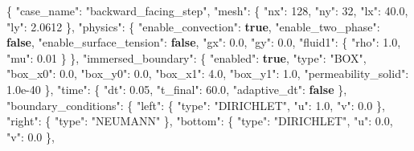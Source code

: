 \documentclass[
  french,
]{article}
\newenvironment{Shaded}{}{}
\newcommand{\DataTypeTok}[1]{\textcolor[rgb]{0.56,0.13,0.00}{#1}}
\newcommand{\DecValTok}[1]{\textcolor[rgb]{0.25,0.63,0.44}{#1}}
\newcommand{\FloatTok}[1]{\textcolor[rgb]{0.25,0.63,0.44}{#1}}
\newcommand{\FunctionTok}[1]{\textcolor[rgb]{0.02,0.16,0.49}{#1}}
\newcommand{\KeywordTok}[1]{\textcolor[rgb]{0.00,0.44,0.13}{\textbf{#1}}}
\newcommand{\StringTok}[1]{\textcolor[rgb]{0.25,0.44,0.63}{#1}}
\begin{document}
\begin{Shaded}
\begin{Highlighting}[]
\FunctionTok{\{}
  \DataTypeTok{"case\_name"}\FunctionTok{:} \StringTok{"backward\_facing\_step"}\FunctionTok{,}
  \DataTypeTok{"mesh"}\FunctionTok{:} \FunctionTok{\{} \DataTypeTok{"nx"}\FunctionTok{:} \DecValTok{128}\FunctionTok{,} \DataTypeTok{"ny"}\FunctionTok{:} \DecValTok{32}\FunctionTok{,} \DataTypeTok{"lx"}\FunctionTok{:} \FloatTok{40.0}\FunctionTok{,} \DataTypeTok{"ly"}\FunctionTok{:} \FloatTok{2.0612} \FunctionTok{\},}
  \DataTypeTok{"physics"}\FunctionTok{:} \FunctionTok{\{}
    \DataTypeTok{"enable\_convection"}\FunctionTok{:} \KeywordTok{true}\FunctionTok{,}
    \DataTypeTok{"enable\_two\_phase"}\FunctionTok{:} \KeywordTok{false}\FunctionTok{,}
    \DataTypeTok{"enable\_surface\_tension"}\FunctionTok{:} \KeywordTok{false}\FunctionTok{,}
    \DataTypeTok{"gx"}\FunctionTok{:} \FloatTok{0.0}\FunctionTok{,} \DataTypeTok{"gy"}\FunctionTok{:} \FloatTok{0.0}\FunctionTok{,}
    \DataTypeTok{"fluid1"}\FunctionTok{:} \FunctionTok{\{} \DataTypeTok{"rho"}\FunctionTok{:} \FloatTok{1.0}\FunctionTok{,} \DataTypeTok{"mu"}\FunctionTok{:} \FloatTok{0.01} \FunctionTok{\}}
  \FunctionTok{\},}
  \DataTypeTok{"immersed\_boundary"}\FunctionTok{:} \FunctionTok{\{}
    \DataTypeTok{"enabled"}\FunctionTok{:} \KeywordTok{true}\FunctionTok{,}
    \DataTypeTok{"type"}\FunctionTok{:} \StringTok{"BOX"}\FunctionTok{,}
    \DataTypeTok{"box\_x0"}\FunctionTok{:} \FloatTok{0.0}\FunctionTok{,} \DataTypeTok{"box\_y0"}\FunctionTok{:} \FloatTok{0.0}\FunctionTok{,} \DataTypeTok{"box\_x1"}\FunctionTok{:} \FloatTok{4.0}\FunctionTok{,} \DataTypeTok{"box\_y1"}\FunctionTok{:} \FloatTok{1.0}\FunctionTok{,}
    \DataTypeTok{"permeability\_solid"}\FunctionTok{:} \FloatTok{1.0e{-}40}
  \FunctionTok{\},}
  \DataTypeTok{"time"}\FunctionTok{:} \FunctionTok{\{} \DataTypeTok{"dt"}\FunctionTok{:} \FloatTok{0.05}\FunctionTok{,} \DataTypeTok{"t\_final"}\FunctionTok{:} \FloatTok{60.0}\FunctionTok{,} \DataTypeTok{"adaptive\_dt"}\FunctionTok{:} \KeywordTok{false} \FunctionTok{\},}
  \DataTypeTok{"boundary\_conditions"}\FunctionTok{:} \FunctionTok{\{}
    \DataTypeTok{"left"}\FunctionTok{:}   \FunctionTok{\{} \DataTypeTok{"type"}\FunctionTok{:} \StringTok{"DIRICHLET"}\FunctionTok{,} \DataTypeTok{"u"}\FunctionTok{:} \FloatTok{1.0}\FunctionTok{,} \DataTypeTok{"v"}\FunctionTok{:} \FloatTok{0.0} \FunctionTok{\},}
    \DataTypeTok{"right"}\FunctionTok{:}  \FunctionTok{\{} \DataTypeTok{"type"}\FunctionTok{:} \StringTok{"NEUMANN"} \FunctionTok{\},}
    \DataTypeTok{"bottom"}\FunctionTok{:} \FunctionTok{\{} \DataTypeTok{"type"}\FunctionTok{:} \StringTok{"DIRICHLET"}\FunctionTok{,} \DataTypeTok{"u"}\FunctionTok{:} \FloatTok{0.0}\FunctionTok{,} \DataTypeTok{"v"}\FunctionTok{:} \FloatTok{0.0} \FunctionTok{\},}

\end{Highlighting}
\end{Shaded}
\end{document}
